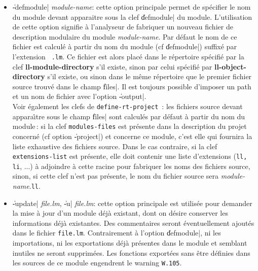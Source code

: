 \begin{itemize}
\item {\Large \|-defmodule| {\em module-name}}: cette option
principale permet de 
sp\'{e}cifier le nom du module devant apparaitre sous la clef \|defmodule| du
module. L'utilisation de cette option signifie \`{a} l'analyseur de
fabriquer un nouveau fichier de description modulaire du module {\em
module-name}.
Par d\'{e}faut le nom de ce fichier est calcul\'{e} \`{a}
partir du nom du module (cf \|defmodule|) suffix\'{e} par l'extension {\tt
.lm}. Ce fichier est alors plac\'{e} dans le r\'{e}pertoire sp\'{e}cifi\'{e} par
la clef {\bf ll-module-directory} s'il existe, sinon par celui
sp\'{e}cifi\'{e} par {\bf ll-object-directory} s'il existe, ou sinon dans
le m\^{e}me r\'{e}pertoire que le premier fichier source trouv\'{e} dans le champ
\|files|. Il est toujours possible d'imposer un path et un nom de
fichier avec l'option \|-output|. \\
Voir \'{e}galement les clefs de {\tt define-rt-project}\ : 
les fichiers source devant appara\^{\i}tre sous le champ \|files| sont
calcul\'{e}s par d\'{e}faut \`{a} partir du nom du module\,: 
si la clef {\tt modules-files} est pr\'{e}sente dans 
la description du projet concern\'{e} (cf option \|-project|) et
concerne ce module, c'est elle qui fournira la liste exhaustive
des fichiers source. Dans le cas contraire, 
si la clef {\tt extensions-list} est
pr\'{e}sente, elle doit
contenir une liste d'extensions ({\tt ll, li}, ...) \`{a} adjoindre \`{a}
cette racine pour fabriquer les noms des fichiers source, sinon, si
cette clef n'est pas pr\'{e}sente, le
nom du fichier source sera {\em module-name}.{\tt ll}.

\item {\Large \|-update| {\em file.lm}, \|-u| {\em file.lm}}:
cette option principale est utilis\'{e}e pour demander la
mise \`{a} jour d'un module d\'{e}j\`{a} existant, dont on d\'{e}sire conserver
les informations d\'{e}j\`{a} existantes. 
Des commentaires seront
\'{e}ventuellement ajout\'{e}s dans le fichier {\tt file.lm}.
Contrairement \`{a} l'option \|defmodule|, ni les
importations, ni les exportations d\'{e}j\`{a} pr\'{e}sentes dans le module et
semblant inutiles ne seront
supprim\'{e}es. Les fonctions export\'{e}es sans \^{e}tre d\'{e}finies dans
les sources de ce module engendrent le warning {\tt W.105}.


\end{itemize}
